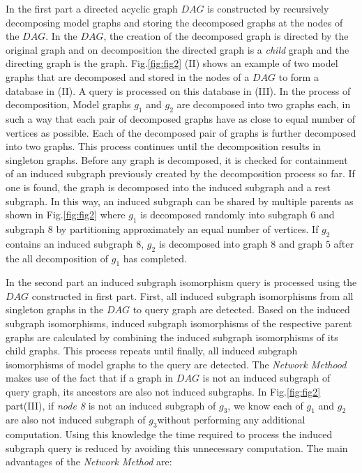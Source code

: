 In the first part a directed acyclic graph $DAG$ is constructed by recursively decomposing model graphs and storing the decomposed graphs at the nodes of the $DAG$.
In the $DAG$, the creation of the decomposed graph is directed by the original graph and on decomposition the directed graph is a \textit{child} graph and the directing graph is the  graph. 
Fig.\ref{fig:fig2} (II) shows an example of two model graphs that are decomposed and stored in the nodes of a $DAG$ to form a database in (II). A query is processed on this database in (III).
In the process of decomposition, Model graphs $g_1$ and $g_2$ are decomposed into two graphs each, in such a way that each pair of decomposed graphs have as close to equal number of vertices  as possible.
Each of the decomposed pair of graphs is further decomposed into two graphs.
This process continues until the decomposition results in singleton graphs.
Before any graph is decomposed, it is checked for containment of an induced subgraph previously created by the decomposition process so far. 
If one is found, the graph is decomposed into the induced subgraph and a rest subgraph.
In this way, an induced subgraph can be shared by multiple parents as shown in Fig.\ref{fig:fig2} where $g_1$ is decomposed randomly into subgraph $6$ and subgraph $8$ by partitioning approximately an equal number of vertices.
If $g_2$ contains an induced subgraph $8$, $g_2$ is decomposed into graph $8$ and graph $5$ after the all decomposition of $g_1$ has completed.

In the second part an induced subgraph isomorphism query is processed using the $DAG$ constructed in first part.
First, all induced subgraph isomorphisms from all singleton graphs in the $DAG$ to query graph are detected.
Based on the induced subgraph isomorphisms, induced subgraph isomorphisms of the respective parent graphs are calculated by combining the induced subgraph isomorphisms of its child graphs. 
This process repeats until finally, all induced subgraph isomorphisms of model graphs to the query are detected.
The \textit{Network Methood} makes use of the fact that if a graph in $DAG$ is not an induced subgraph of query graph, its ancestors are also not induced subgraphs.
In Fig.\ref{fig:fig2} part(III), if \textit{node 8} is not an induced subgraph of $g_3$, we know each of $g_1$ and $g_2$ are also not induced subgraph of $g_3$without performing any additional computation. 
Using this knowledge the time required to process the induced subgraph query is reduced by avoiding this unnecessary computation. 
The main advantages of the \textit{Network Method}  are:  

